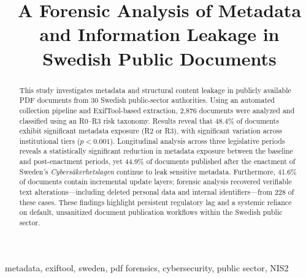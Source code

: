 \documentclass[conference]{IEEEtran}
\begin{document}
\title{A Forensic Analysis of Metadata and Information Leakage in Swedish Public Documents}

\author{
}

\maketitle

\begin{abstract}
This study investigates metadata and structural content leakage in publicly available PDF documents from 30 Swedish public-sector authorities. Using an automated collection pipeline and ExifTool-based extraction, 2,876 documents were analyzed and classified using an R0--R3 risk taxonomy. Results reveal that 48.4\% of documents exhibit significant metadata exposure (R2 or R3), with significant variation across institutional tiers ($p < 0.001$). Longitudinal analysis across three legislative periods reveals a statistically significant reduction in metadata exposure between the baseline and post-enactment periods, yet 44.9\% of documents published after the enactment of Sweden's \textit{Cybers\"{a}kerhetslagen} continue to leak sensitive metadata. Furthermore, 41.6\% of documents contain incremental update layers; forensic analysis recovered verifiable text alterations---including deleted personal data and internal identifiers---from 228 of these cases. These findings highlight persistent regulatory lag and a systemic reliance on default, unsanitized document publication workflows within the Swedish public sector.
\end{abstract}

\begin{IEEEkeywords}
metadata, exiftool, sweden, pdf forensics, cybersecurity, public sector, NIS2
\end{IEEEkeywords}
\end{document}

